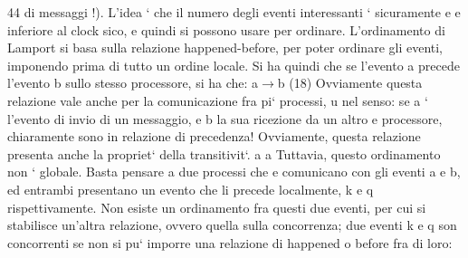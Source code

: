 \documentclass[a4paper,12pt]{article}
\begin{document}
44
di messaggi !). L'idea ` che il numero degli eventi interessanti ` sicuramente
e
e
inferiore al clock sico, e quindi si possono usare per ordinare.
L'ordinamento di Lamport si basa sulla relazione happened-before, per poter
ordinare gli eventi, imponendo prima di tutto un ordine locale. Si ha quindi che
se l'evento a precede l'evento b sullo stesso processore, si ha che:
a$\rightarrow$b
(18)
Ovviamente questa relazione vale anche per la comunicazione fra pi` processi,
u
nel senso: se a ` l'evento di invio di un messaggio, e b la sua ricezione da un altro
e
processore, chiaramente sono in relazione di precedenza! Ovviamente, questa
relazione presenta anche la propriet` della transitivit`.
a
a
Tuttavia, questo ordinamento non ` globale. Basta pensare a due processi che
e
comunicano con gli eventi a e b, ed entrambi presentano un evento che li precede
localmente, k e q rispettivamente. Non esiste un ordinamento fra questi due
eventi, per cui si stabilisce un'altra relazione, ovvero quella sulla concorrenza;
due eventi k e q son concorrenti se non si pu` imporre una relazione di happened
o
before fra di loro:
\end{document}
